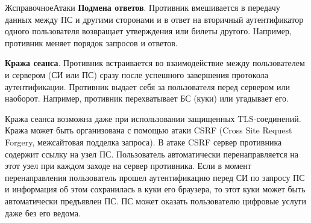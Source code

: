 \begin{appendix}{Ж}{справочное}{Атаки}
{\bf Подмена ответов}.
Противник вмешивается в передачу данных между ПС и другими сторонами 
и в ответ на вторичный аутентификатор одного пользователя
возвращает утверждения или билеты другого.
%
Например, противник меняет порядок запросов и ответов.


{\bf Кража сеанса}. 
Противник встраивается во взаимодействие между пользователем 
и сервером (СИ или ПС) сразу после успешного завершения протокола 
аутентификации. Противник выдает себя за пользователя перед сервером 
или наоборот. 
%
Например, противник перехватывает БС (куки) или угадывает его. 


\begin{note*}
Кража сеанса возможна даже при использовании защищенных TLS-соединений. 
Кража может быть организована с помощью атаки CSRF (Cross Site Request 
Forgery, межсайтовая подделка запроса). В атаке CSRF сервер противника 
содержит ссылку на узел ПС. Пользователь автоматически перенаправляется 
на этот узел при каждом заходе на сервер противника. 
Если в момент перенаправления пользователь прошел аутентификацию
перед СИ по запросу ПС и информация об этом сохранилась в куки его браузера,
то этот куки может быть автоматически предъявлен ПС.
%
ПС может оказать пользователю цифровые услуги даже без его ведома.
%
\end{note*}

\end{appendix}